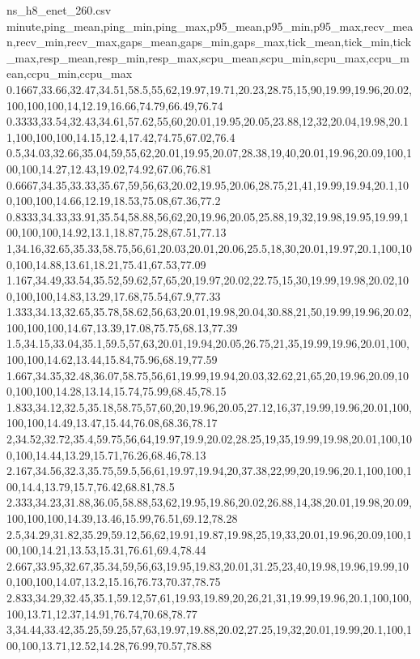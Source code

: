 \begin{filecontents*}[overwrite]{ns_h8_enet_260.csv}
minute,ping_mean,ping_min,ping_max,p95_mean,p95_min,p95_max,recv_mean,recv_min,recv_max,gaps_mean,gaps_min,gaps_max,tick_mean,tick_min,tick_max,resp_mean,resp_min,resp_max,scpu_mean,scpu_min,scpu_max,ccpu_mean,ccpu_min,ccpu_max
0.1667,33.66,32.47,34.51,58.5,55,62,19.97,19.71,20.23,28.75,15,90,19.99,19.96,20.02,100,100,100,14,12.19,16.66,74.79,66.49,76.74
0.3333,33.54,32.43,34.61,57.62,55,60,20.01,19.95,20.05,23.88,12,32,20.04,19.98,20.11,100,100,100,14.15,12.4,17.42,74.75,67.02,76.4
0.5,34.03,32.66,35.04,59,55,62,20.01,19.95,20.07,28.38,19,40,20.01,19.96,20.09,100,100,100,14.27,12.43,19.02,74.92,67.06,76.81
0.6667,34.35,33.33,35.67,59,56,63,20.02,19.95,20.06,28.75,21,41,19.99,19.94,20.1,100,100,100,14.66,12.19,18.53,75.08,67.36,77.2
0.8333,34.33,33.91,35.54,58.88,56,62,20,19.96,20.05,25.88,19,32,19.98,19.95,19.99,100,100,100,14.92,13.1,18.87,75.28,67.51,77.13
1,34.16,32.65,35.33,58.75,56,61,20.03,20.01,20.06,25.5,18,30,20.01,19.97,20.1,100,100,100,14.88,13.61,18.21,75.41,67.53,77.09
1.167,34.49,33.54,35.52,59.62,57,65,20,19.97,20.02,22.75,15,30,19.99,19.98,20.02,100,100,100,14.83,13.29,17.68,75.54,67.9,77.33
1.333,34.13,32.65,35.78,58.62,56,63,20.01,19.98,20.04,30.88,21,50,19.99,19.96,20.02,100,100,100,14.67,13.39,17.08,75.75,68.13,77.39
1.5,34.15,33.04,35.1,59.5,57,63,20.01,19.94,20.05,26.75,21,35,19.99,19.96,20.01,100,100,100,14.62,13.44,15.84,75.96,68.19,77.59
1.667,34.35,32.48,36.07,58.75,56,61,19.99,19.94,20.03,32.62,21,65,20,19.96,20.09,100,100,100,14.28,13.14,15.74,75.99,68.45,78.15
1.833,34.12,32.5,35.18,58.75,57,60,20,19.96,20.05,27.12,16,37,19.99,19.96,20.01,100,100,100,14.49,13.47,15.44,76.08,68.36,78.17
2,34.52,32.72,35.4,59.75,56,64,19.97,19.9,20.02,28.25,19,35,19.99,19.98,20.01,100,100,100,14.44,13.29,15.71,76.26,68.46,78.13
2.167,34.56,32.3,35.75,59.5,56,61,19.97,19.94,20,37.38,22,99,20,19.96,20.1,100,100,100,14.4,13.79,15.7,76.42,68.81,78.5
2.333,34.23,31.88,36.05,58.88,53,62,19.95,19.86,20.02,26.88,14,38,20.01,19.98,20.09,100,100,100,14.39,13.46,15.99,76.51,69.12,78.28
2.5,34.29,31.82,35.29,59.12,56,62,19.91,19.87,19.98,25,19,33,20.01,19.96,20.09,100,100,100,14.21,13.53,15.31,76.61,69.4,78.44
2.667,33.95,32.67,35.34,59,56,63,19.95,19.83,20.01,31.25,23,40,19.98,19.96,19.99,100,100,100,14.07,13.2,15.16,76.73,70.37,78.75
2.833,34.29,32.45,35.1,59.12,57,61,19.93,19.89,20,26,21,31,19.99,19.96,20.1,100,100,100,13.71,12.37,14.91,76.74,70.68,78.77
3,34.44,33.42,35.25,59.25,57,63,19.97,19.88,20.02,27.25,19,32,20.01,19.99,20.1,100,100,100,13.71,12.52,14.28,76.99,70.57,78.88

\end{filecontents*}

